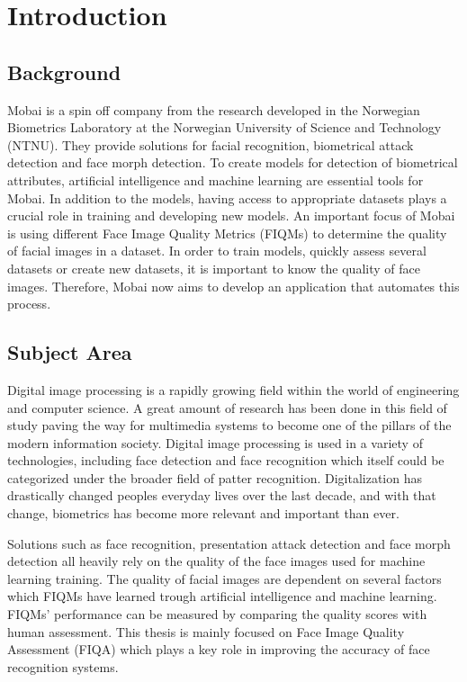 \chapter{Introduction}
\label{chap:Intro}

\section{Background}
\label{section:background}
Mobai is a spin off company from the research developed in the Norwegian Biometrics Laboratory at the Norwegian University of Science and Technology (NTNU). They provide solutions for facial recognition, biometrical attack detection and face morph detection. To create models for detection of biometrical attributes, artificial intelligence and machine learning are essential tools for Mobai. In addition to the models, having access to appropriate datasets plays a crucial role in training and developing new models. An important focus of Mobai is using different Face Image Quality Metrics (FIQMs) to determine the quality of facial images in a dataset. In order to train models, quickly assess several datasets or create new datasets, it is important to know the quality of face images. Therefore, Mobai now aims to develop an application that automates this process. 

\section{Subject Area}
Digital image processing is a rapidly growing field within the world of engineering and computer science. A great amount of research has been done in this field of study paving the way for multimedia systems to become one of the pillars of the modern information society. Digital image processing is used in a variety of technologies, including face detection and face recognition which itself could be categorized under the broader field of patter recognition. Digitalization has drastically changed peoples everyday lives over the last decade, and with that change, biometrics has become more relevant and important than ever. 

Solutions such as face recognition, presentation attack detection and face morph detection all heavily rely on the quality of the face images used for machine learning training. The quality of facial images are dependent on several factors which FIQMs have learned trough artificial intelligence and machine learning. FIQMs' performance can be measured by comparing the quality scores with human assessment. This thesis is mainly focused on Face Image Quality Assessment (FIQA) which plays a key role in improving the accuracy of face recognition systems. 


